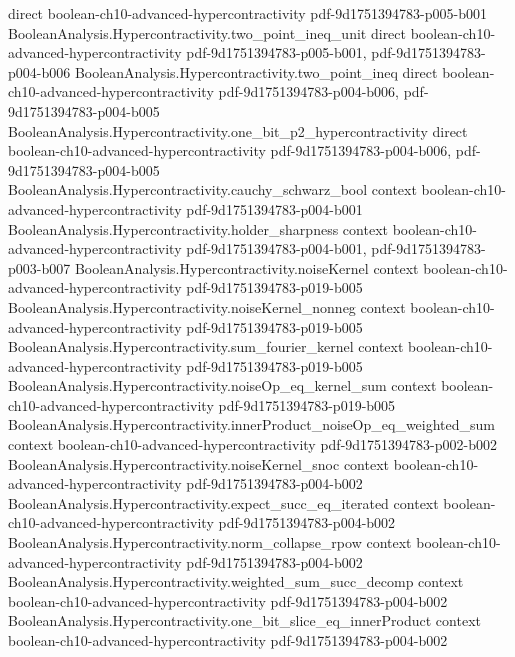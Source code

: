 \begin{theorem}
  {direct}
  {boolean-ch10-advanced-hypercontractivity}
  {pdf-9d1751394783-p005-b001}
\proofstep
  {BooleanAnalysis.Hypercontractivity.two_point_ineq_unit}
  {direct}
  {boolean-ch10-advanced-hypercontractivity}
  {pdf-9d1751394783-p005-b001,
    pdf-9d1751394783-p004-b006}
\proofstep
  {BooleanAnalysis.Hypercontractivity.two_point_ineq}
  {direct}
  {boolean-ch10-advanced-hypercontractivity}
  {pdf-9d1751394783-p004-b006,
    pdf-9d1751394783-p004-b005}
\proofstep
  {BooleanAnalysis.Hypercontractivity.one_bit_p2_hypercontractivity}
  {direct}
  {boolean-ch10-advanced-hypercontractivity}
  {pdf-9d1751394783-p004-b006,
    pdf-9d1751394783-p004-b005}
\proofstep
  {BooleanAnalysis.Hypercontractivity.cauchy_schwarz_bool}
  {context}
  {boolean-ch10-advanced-hypercontractivity}
  {pdf-9d1751394783-p004-b001}
\proofstep
  {BooleanAnalysis.Hypercontractivity.holder_sharpness}
  {context}
  {boolean-ch10-advanced-hypercontractivity}
  {pdf-9d1751394783-p004-b001,
    pdf-9d1751394783-p003-b007}
\proofstep
  {BooleanAnalysis.Hypercontractivity.noiseKernel}
  {context}
  {boolean-ch10-advanced-hypercontractivity}
  {pdf-9d1751394783-p019-b005}
\proofstep
  {BooleanAnalysis.Hypercontractivity.noiseKernel_nonneg}
  {context}
  {boolean-ch10-advanced-hypercontractivity}
  {pdf-9d1751394783-p019-b005}
\proofstep
  {BooleanAnalysis.Hypercontractivity.sum_fourier_kernel}
  {context}
  {boolean-ch10-advanced-hypercontractivity}
  {pdf-9d1751394783-p019-b005}
\proofstep
  {BooleanAnalysis.Hypercontractivity.noiseOp_eq_kernel_sum}
  {context}
  {boolean-ch10-advanced-hypercontractivity}
  {pdf-9d1751394783-p019-b005}
\proofstep
  {BooleanAnalysis.Hypercontractivity.innerProduct_noiseOp_eq_weighted_sum}
  {context}
  {boolean-ch10-advanced-hypercontractivity}
  {pdf-9d1751394783-p002-b002}
\proofstep
  {BooleanAnalysis.Hypercontractivity.noiseKernel_snoc}
  {context}
  {boolean-ch10-advanced-hypercontractivity}
  {pdf-9d1751394783-p004-b002}
\proofstep
  {BooleanAnalysis.Hypercontractivity.expect_succ_eq_iterated}
  {context}
  {boolean-ch10-advanced-hypercontractivity}
  {pdf-9d1751394783-p004-b002}
\proofstep
  {BooleanAnalysis.Hypercontractivity.norm_collapse_rpow}
  {context}
  {boolean-ch10-advanced-hypercontractivity}
  {pdf-9d1751394783-p004-b002}
\proofstep
  {BooleanAnalysis.Hypercontractivity.weighted_sum_succ_decomp}
  {context}
  {boolean-ch10-advanced-hypercontractivity}
  {pdf-9d1751394783-p004-b002}
\proofstep
  {BooleanAnalysis.Hypercontractivity.one_bit_slice_eq_innerProduct}
  {context}
  {boolean-ch10-advanced-hypercontractivity}
  {pdf-9d1751394783-p004-b002}

\end{theorem}
